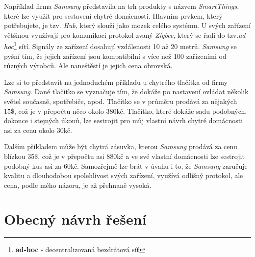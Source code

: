 Například firma \emph{Samsung} představila na trh produkty s názvem \emph{SmartThings}, které lze využít pro sestavení chytré domácnosti.
Hlavním prvkem, který potřebujete, je tzv. \emph{Hub}, který slouží jako mozek celého systému.
U svých zařízení většinou využívají pro komunikaci protokol zvaný \emph{Zigbee}, který se řadí do tzv.\emph{ad-hoc}\footnote{\textbf{ad-hoc} - decentralizovaná bezdrátová síť} sítí.
Signály ze zařízení dosahují vzdálenosti 10 až 20 metrů.
\emph{Samsung} se pyšní tím, že jejich zařízení jsou kompatibilní s více než 100 zařízeními od různých výrobců. Ale naneštěstí je jejich cena obrovská.

Lze si to představit na jednoduchém příkladu u chytrého tlačítka od firmy \emph{Samsung}.
Dané tlačítko se vyznačuje tím, že dokáže po nastavení ovládat několik světel současně, spotřebiče, apod.
Tlačítko se v průměru prodává za nějakých 15̈́\$, což je v přepočtu něco okolo 380kč.
Tlačítko, které dokáže sadu podobných, dokonce i stejných úkonů, lze sestrojit pro můj vlastní návrh chytré domácnosti asi za cenu okolo 30kč.

Dalším příkladem může být chytrá zásuvka, kterou \emph{Samsung} prodává za cenu blízkou 35\$, což je v přepočtu asi 880kč a ve své vlastní domácnosti lze sestrojit podobný kus asi za 60kč.
Samozřejmě lze brát v úvahu i to, že \emph{Samsung} zaručuje kvalitu a dlouhodobou spolehlivost svých zařízení, využívá odlišný protokol, ale cena, podle mého názoru, je až přehnaně vysoká.

\newpage

\section*{Obecný návrh řešení}
\label{navrh:reseni}


